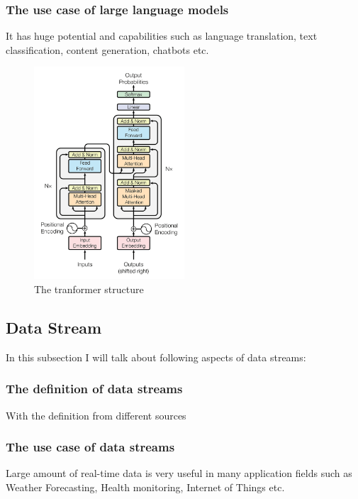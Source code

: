\documentclass[runningheads]{llncs}
\begin{document}
    \subsubsection{The use case of large language models} 
    
    It has huge potential and capabilities such as language translation, text classification,
    content generation, chatbots etc.
    \begin{figure}[htbp]
      \centering
      \includegraphics[width=0.5\textwidth]{attention1.jpg}
      \caption{The tranformer structure}
      \label{fig:attention}
  \end{figure}

\subsection{Data Stream}
In this subsection I will talk about following aspects of data streams:
    \subsubsection{The definition of data streams} With the definition from different sources
    \subsubsection{The use case of data streams} Large amount of real-time data is very useful in many application fields such as Weather Forecasting, Health monitoring, Internet of Things etc.
\end{document}
